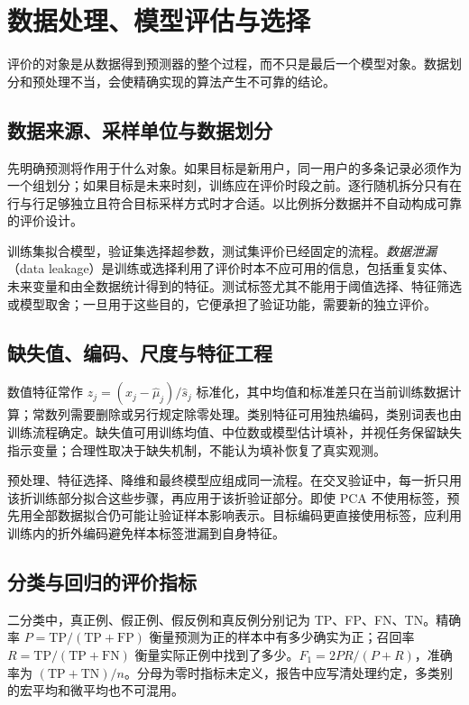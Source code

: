\setcounter{chapter}{4} %
\chapter{数据处理、模型评估与选择}
\label{chap:ml-evaluation}

评价的对象是从数据得到预测器的整个过程，而不只是最后一个模型对象。数据划分和预处理不当，会使精确实现的算法产生不可靠的结论。

\section{数据来源、采样单位与数据划分}

先明确预测将作用于什么对象。如果目标是新用户，同一用户的多条记录必须作为一个组划分；如果目标是未来时刻，训练应在评价时段之前。逐行随机拆分只有在行与行足够独立且符合目标采样方式时才合适。以比例拆分数据并不自动构成可靠的评价设计。

训练集拟合模型，验证集选择超参数，测试集评价已经固定的流程。\emph{数据泄漏}（data leakage）是训练或选择利用了评价时本不应可用的信息，包括重复实体、未来变量和由全数据统计得到的特征。测试标签尤其不能用于阈值选择、特征筛选或模型取舍；一旦用于这些目的，它便承担了验证功能，需要新的独立评价。

\section{缺失值、编码、尺度与特征工程}

数值特征常作 $z_j=(x_j-\widehat\mu_j)/\widehat s_j$ 标准化，其中均值和标准差只在当前训练数据计算；常数列需要删除或另行规定除零处理。类别特征可用独热编码，类别词表也由训练流程确定。缺失值可用训练均值、中位数或模型估计填补，并视任务保留缺失指示变量；合理性取决于缺失机制，不能认为填补恢复了真实观测。

预处理、特征选择、降维和最终模型应组成同一流程。在交叉验证中，每一折只用该折训练部分拟合这些步骤，再应用于该折验证部分。即使 PCA 不使用标签，预先用全部数据拟合仍可能让验证样本影响表示。目标编码更直接使用标签，应利用训练内的折外编码避免样本标签泄漏到自身特征。

\section{分类与回归的评价指标}

二分类中，真正例、假正例、假反例和真反例分别记为 TP、FP、FN、TN。精确率 $P=\mathrm{TP}/(\mathrm{TP}+\mathrm{FP})$ 衡量预测为正的样本中有多少确实为正；召回率 $R=\mathrm{TP}/(\mathrm{TP}+\mathrm{FN})$ 衡量实际正例中找到了多少。$F_1=2PR/(P+R)$，准确率为 $(\mathrm{TP}+\mathrm{TN})/n$。分母为零时指标未定义，报告中应写清处理约定，多类别的宏平均和微平均也不可混用。

